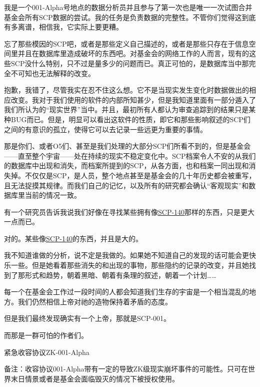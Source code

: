 \begin{scpbox}
我是一个001-Alpha号地点的数据分析员并且参与了第一次也是唯一一次试图合并基金会所有SCP数据的尝试。我的任务是负责数据的完整性。不管你们觉得这到底有多离谱，相信我，它实际上要更糟。

忘了那些模因的SCP吧，或者是那些定义自己描述的，或者是那些只存在于信息空间里并且在数据库里造成破坏的东西吧。对基金会的网络工作的人而言，现有的这些SCP没什么特别，只不过是量多少的问题而已。真正可怕的，是数据库当中那完全不可知也无法解释的改变。

抱歉，我错了，尽管我实在忍不住这么想。它不是当现实发生变化时数据做出的相应改变。我对于我们使用的软件的内部所知甚少，但是我知道里面有一部分遁入了我们所认为的“现实世界”当中。并且，最初所有人都认为审查追踪到的结果只是某种BUG而已。但是，明显可以看出这软件的性质，即它和那些影响叙述的SCP们之间的有意识的孤立，使得它可以去记录一些远更为重要的事情。

那是你们、或者O5们、甚至是我们处理的大部分SCP们所看不到的，但是基金会——直至整个宇宙——处在持续的现实不稳定变化中。SCP档案令人不安的从我们的数据库中出现和消失，而档案所提到的SCP，从各方面，也和档案一同出现和消失掉。不仅仅是SCP，是人员，整个地点甚至是基金会的几十年历史都会被重写，且无法捉摸其规律。而我们自己的记忆，以及所有的研究都会确认“客观现实”和数据库里当前的情况一致。

有一个研究员告诉我说我们好像在寻找某些拥有像\hyperref[chap:SCP-140]{SCP-140}那样的东西，只是更大一点而已。

对的。某些像\hyperref[chap:SCP-140]{SCP-140}的东西，并且是大的。

我不知道谁做的分析，说不定是我做的。如果她不知道自己的发现的话可能会更快乐一些。但是她看着那些消失的和出现的事物，那些隐约的记录的改变，并且她找到了那形式和趋势，朝着黑暗、朝着有条理的叙述，朝着一个计划……

每一个在基金会工作过一段时间的人都会知道我们生存的宇宙是一个相当混乱的地方。我们仍然相信上帝对祂的造物保持着矛盾的态度。

但是我们最终发现确实有一个上帝，那就是SCP-001。

而那是一群可怕的作者们。

\end{scpbox}

紧急收容协议ZK-001-Alpha 



备注：收容协议001-Alpha带有一定的导致ZK级现实崩坏事件的可能性。只可在世界末日情景或者是基金会面临毁灭的情况下被授权使用。

